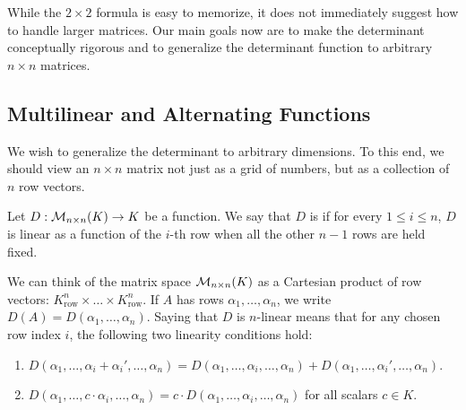 \begin{goals}\label{goals:determinants}
  While the $2 \times 2$ formula is easy to memorize, it does not immediately suggest how to handle larger matrices. Our main goals now are to make the determinant conceptually rigorous and to generalize the determinant function to arbitrary $n \times n$ matrices.
\end{goals}

\subsection{Multilinear and Alternating Functions}

We wish to generalize the determinant to arbitrary dimensions. To this end, we should view an $n \times n$ matrix not just as a grid of numbers, but as a collection of $n$ row vectors.

\begin{definition}[$n$-Linearity]\label{def:n_linear}
  Let $D : \mathcal{M}_{n \times n}(K) \to K$ be a function. We say that $D$ is  if for every $1 \le i \le n$, $D$ is linear as a function of the $i$-th row when all the other $n-1$ rows are held fixed.
\end{definition}

We can think of the matrix space $\mathcal{M}_{n \times n}(K)$ as a Cartesian product of row vectors: $K^n_{\text{row}} \times \dots \times K^n_{\text{row}}$. If $A$ has rows $\alpha_1, \dots, \alpha_n$, we write $D(A) = D(\alpha_1, \dots, \alpha_n)$.
Saying that $D$ is $n$-linear means that for any chosen row index $i$, the following two linearity conditions hold:
\begin{enumerate}
  \item $D(\alpha_1, \dots, \alpha_i + \alpha_i', \dots, \alpha_n) = D(\alpha_1, \dots, \alpha_i, \dots, \alpha_n) + D(\alpha_1, \dots, \alpha_i', \dots, \alpha_n)$.
  \item $D(\alpha_1, \dots, c \cdot \alpha_i, \dots, \alpha_n) = c \cdot D(\alpha_1, \dots, \alpha_i, \dots, \alpha_n)$ for all scalars $c \in K$.
\end{enumerate}

